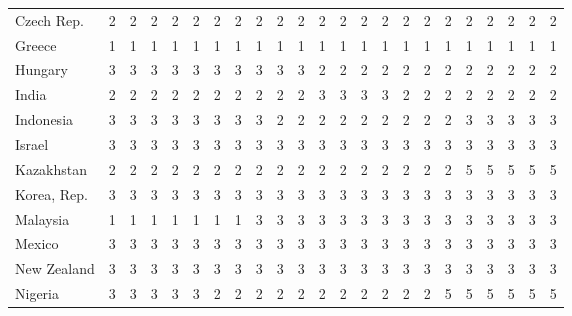 \documentclass{article}
\begin{document}
\begin{table}[htbp]
\begin{adjustwidth}{-3cm}{}
\begin{tabular}{lcccccccccccccccccccccc}
    Czech Rep. & 2     & 2     & 2     & 2     & 2     & 2     & 2     & 2     & 2     & 2     & 2     & 2     & 2     & 2     & 2     & 2     & 2     & 2     & 2     & 2     & 2     & 2 \\
    Greece & 1     & 1     & 1     & 1     & 1     & 1     & 1     & 1     & 1     & 1     & 1     & 1     & 1     & 1     & 1     & 1     & 1     & 1     & 1     & 1     & 1     & 1 \\
    Hungary & 3     & 3     & 3     & 3     & 3     & 3     & 3     & 3     & 3     & 3     & 2     & 2     & 2     & 2     & 2     & 2     & 2     & 2     & 2     & 2     & 2     & 2 \\
    India & 2     & 2     & 2     & 2     & 2     & 2     & 2     & 2     & 2     & 2     & 3     & 3     & 3     & 3     & 2     & 2     & 2     & 2     & 2     & 2     & 2     & 2 \\
    Indonesia & 3     & 3     & 3     & 3     & 3     & 3     & 3     & 3     & 2     & 2     & 2     & 2     & 2     & 2     & 2     & 2     & 2     & 3     & 3     & 3     & 3     & 3 \\
    Israel & 3     & 3     & 3     & 3     & 3     & 3     & 3     & 3     & 3     & 3     & 3     & 3     & 3     & 3     & 3     & 3     & 3     & 3     & 3     & 3     & 3     & 3 \\
    Kazakhstan & 2     & 2     & 2     & 2     & 2     & 2     & 2     & 2     & 2     & 2     & 2     & 2     & 2     & 2     & 2     & 2     & 2     & 5     & 5     & 5     & 5     & 5 \\
    Korea, Rep. & 3     & 3     & 3     & 3     & 3     & 3     & 3     & 3     & 3     & 3     & 3     & 3     & 3     & 3     & 3     & 3     & 3     & 3     & 3     & 3     & 3     & 3 \\
    Malaysia & 1     & 1     & 1     & 1     & 1     & 1     & 1     & 3     & 3     & 3     & 3     & 3     & 3     & 3     & 3     & 3     & 3     & 3     & 3     & 3     & 3     & 3 \\
    Mexico & 3     & 3     & 3     & 3     & 3     & 3     & 3     & 3     & 3     & 3     & 3     & 3     & 3     & 3     & 3     & 3     & 3     & 3     & 3     & 3     & 3     & 3 \\
    New Zealand & 3     & 3     & 3     & 3     & 3     & 3     & 3     & 3     & 3     & 3     & 3     & 3     & 3     & 3     & 3     & 3     & 3     & 3     & 3     & 3     & 3     & 3 \\
    Nigeria & 3     & 3     & 3     & 3     & 3     & 2     & 2     & 2     & 2     & 2     & 2     & 2     & 2     & 2     & 2     & 2     & 5     & 5     & 5     & 5     & 5     & 5 \\

\end{tabular}
\end{adjustwidth}
\end{table}
\end{document}
